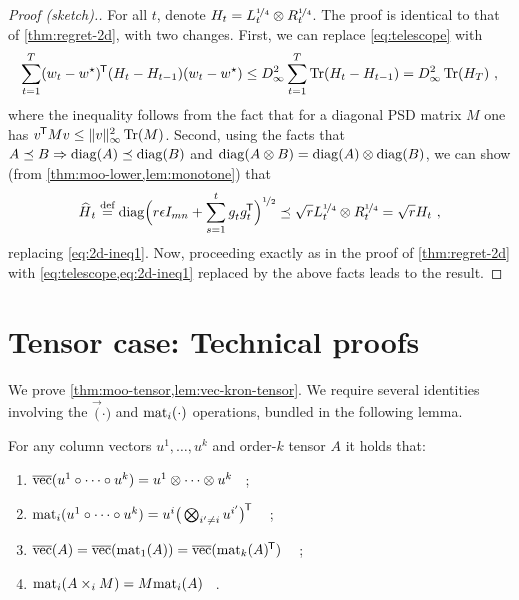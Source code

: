 \begin{proof}[Proof (sketch).]
For all $t$, denote $H_t = L_t^{{\smash{\nicefrac{1}{4}}}} \otimes R_t^{{\smash{\nicefrac{1}{4}}}}$.
The proof is identical to that of \cref{thm:regret-2d}, with two changes.
First, we can replace \cref{eq:telescope} with
\begin{align*}
\sum_{t=1}^T (w_t-w^\star)^{\mkern-1.5mu\scriptstyle\mathsf{T}} (H_t - H_{t-1}) (w_t-w^\star)
	\le D_\infty^2 \sum_{t=1}^T \operatorname*{Tr}(H_t - H_{t-1}) = D_\infty^2 \operatorname*{Tr}(H_T) ~,
\end{align*}
where the inequality follows from the fact that for a diagonal PSD matrix $M$ one has $v^{\mkern-1.5mu\scriptstyle\mathsf{T}} M v \le \|v\|_\infty^2 \operatorname*{Tr}(M)$.
%
Second, using the facts that $A \preceq B \Rightarrow \operatorname*{diag}(A) \preceq \operatorname*{diag}(B)$ and $\operatorname*{diag}(A \otimes B) = \operatorname*{diag}(A) \otimes \operatorname*{diag}(B)$, we can show (from \cref{thm:moo-lower,lem:monotone}) that
\begin{align*}
\smash{\widehat{H}}_t \stackrel{\text{def}}{=} 
\operatorname*{diag}\mathopen{}\Big(r\epsilon I_{mn} + \sum_{s=1}^t g_t^{} g_t^{\mkern-1.5mu\scriptstyle\mathsf{T}}\Big)^{{\smash{\nicefrac{1}{2}}}}
\preceq
\sqrt{r} L_t^{{\smash{\nicefrac{1}{4}}}} \otimes R_t^{{\smash{\nicefrac{1}{4}}}} 
=
\sqrt{r} H_t
~,
\end{align*}
replacing \cref{eq:2d-ineq1}.
Now, proceeding exactly as in the proof of \cref{thm:regret-2d} with \cref{eq:telescope,eq:2d-ineq1} replaced by the above facts leads to the result.
\end{proof}






\section{Tensor case: Technical proofs}
\label{app:tensor}

We prove \cref{thm:moo-tensor,lem:vec-kron-tensor}.  We require several
identities involving the $\vec(\cdot)$ and $\mathrm{mat}_{i}(\cdot)$ operations,
bundled in the following lemma.

\begin{lemma} \label{lem:vec-mat-tensor}
For any column vectors $u^1,\ldots,u^k$ and order-$k$ tensor $A$ it holds that:
\begin{enumerate}[label=(\roman*)]
\item
$\overline{\mathrm{vec}}(u^1 \circ \cdots \circ u^k) = u^1 \otimes \cdots \otimes u^k$~ ;
\item
$\mathrm{mat}_{i}(u^1 \circ \cdots \circ u^k) = u^i \big(\bigotimes_{i'\ne i} u^{i'} \big)^{\mkern-1.5mu\scriptstyle\mathsf{T}}$ ~ ;
\item
$\overline{\mathrm{vec}}(A) = \overline{\mathrm{vec}}(\mathrm{mat}_{1}(A)) = \overline{\mathrm{vec}}(\mathrm{mat}_{k}(A)^{\mkern-1.5mu\scriptstyle\mathsf{T}})$ ~ ;
\item
$\mathrm{mat}_{i}(A\times_i M) = M \mathrm{mat}_{i}(A)$~ .
\end{enumerate}
\end{lemma}

